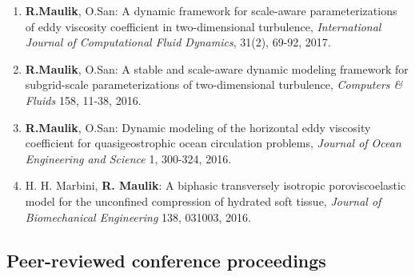 \documentclass[letterpaper]{article}
\begin{document}
\begin{enumerate}
\item \textbf{R.Maulik}, O.San: A dynamic framework for scale-aware parameterizations of eddy viscosity coefficient in two-dimensional turbulence, {\it International Journal of Computational Fluid Dynamics}, 31(2), 69-92, 2017.

\item \textbf{R.Maulik}, O.San: A stable and scale-aware dynamic modeling framework for subgrid-scale parameterizations of two-dimensional turbulence, {\it Computers \& Fluids} 158, 11-38, 2016.

\item \textbf{R.Maulik}, O.San: Dynamic modeling of the horizontal eddy viscosity coefficient for quasigeostrophic ocean circulation problems, {\it Journal of Ocean Engineering and Science} 1, 300-324, 2016.

\item H. H. Marbini, \textbf{R. Maulik}: A biphasic transversely isotropic poroviscoelastic model for the unconfined compression of hydrated soft tissue, {\it Journal of Biomechanical Engineering} 138, 031003, 2016.

\end{enumerate}

\subsection*{Peer-reviewed conference proceedings}
\end{document}
